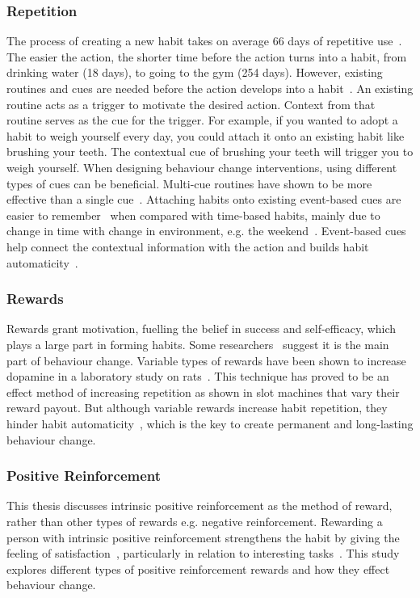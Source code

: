 \subsubsection*{Repetition}
The process of creating a new habit takes on average 66 days of repetitive use~\cite{article_how_habits_formed_modelling_habit_formation}. The easier the action, the shorter time before the action turns into a habit, from drinking water (18 days), to going to the gym (254 days). However, existing routines and cues are needed before the action develops into a habit~\cite{habits_event_cues_1, habits_event_cues_2}. An existing routine acts as a trigger to motivate the desired action. Context from that routine serves as the cue for the trigger. For example, if you wanted to adopt a habit to weigh yourself every day, you could attach it onto an existing habit like brushing your teeth. The contextual cue of brushing your teeth will trigger you to weigh yourself. When designing behaviour change interventions, using different types of cues can be beneficial. Multi-cue routines have shown to be more effective than a single cue~\cite{article_understanding_use_contextual_cues_design_impl}. Attaching habits onto existing event-based cues are easier to remember~\cite{article_implementation_intentions_multicue} when compared with time-based habits, mainly due to change in time with change in environment, e.g. the weekend~\cite{coaching_not_that_good}. Event-based cues help connect the contextual information with the action and builds habit automaticity~\cite{article_implementation_intentions}.

\subsubsection*{Rewards}
Rewards grant motivation, fuelling the belief in success and self-efficacy, which plays a large part in forming habits. Some researchers~\cite{article_a_self_efficacy} suggest it is the main part of behaviour change. Variable types of rewards have been shown to increase dopamine in a laboratory study on rats~\cite{variable_rewards_increases_dopamine}. This technique has proved to be an effect method of increasing repetition as shown in slot machines that vary their reward payout. But although variable rewards increase habit repetition, they hinder habit automaticity~\cite{variable_rewards_increases_dopamine}, which is the key to create permanent and long-lasting behaviour change.

\subsubsection*{Positive Reinforcement}
This thesis discusses intrinsic positive reinforcement as the method of reward, rather than other types of rewards e.g. negative reinforcement. Rewarding a person with intrinsic positive reinforcement strengthens the habit by giving the feeling of satisfaction~\cite{article_promoting_habit_formation}, particularly in relation to interesting tasks~\cite{article_meta_analytic_review_intrinsic_motivation}. This study explores different types of positive reinforcement rewards and how they effect behaviour change.


